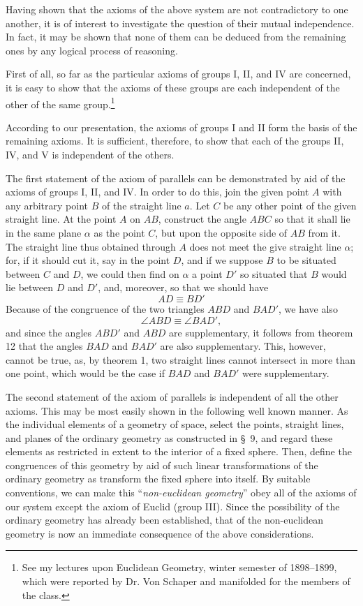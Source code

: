 \documentclass[11pt,oneside]{book}
\begin{document}
Having shown that the axioms of the above system are not
contradictory to one another, it is of interest to
investigate the question of their mutual independence.
In fact, it may be shown that none of them can be
deduced from the remaining ones by any logical process
of reasoning.

First of all, so far as the particular axioms of groups
I, II, and IV are concerned, it is easy to show that
the axioms of these groups are each independent of the
other of the same group.\footnote{See my lectures upon
Euclidean Geometry, winter semester of 1898--1899, which
were reported by Dr. Von Schaper and manifolded for the
members of the class.}

According to our presentation, the axioms of groups I and II form
the basis of the remaining axioms. It is sufficient, therefore, to
show that each of the groups II, IV, and V is independent of the
others.

The first statement of the axiom of parallels can be demonstrated
by aid of the axioms of groups I, II, and IV\@. In order to do this,
join the given point $A$ with any arbitrary point $B$ of the
straight line $a$. Let $C$ be any other point of the given straight
line. At
the point $A$ on $AB$, construct the angle $ABC$ so that it shall
lie in the same plane $\alpha$ as the point $C$, but upon the
opposite side of $AB$ from it. The straight line thus obtained
through $A$ does not meet the give straight line $\alpha$; for, if
it should cut it, say in the point $D$, and if we suppose $B$ to be
situated between $C$ and $D$, we could then find on $\alpha$ a
point $D'$ so situated that $B$ would lie between $D$ and $D'$,
and, moreover, so that we should have
\[
  AD \equiv BD'
\]
Because of the congruence of the two triangles $ABD$ and $BAD'$,
we have also
\[
  \angle ABD \equiv \angle BAD',
\]
and since the angles $ABD'$ and $ABD$ are supplementary,
it follows from theorem 12 that the angles $BAD$ and $BAD'$ are
also supplementary. This, however, cannot be true, as,
by theorem 1, two straight lines cannot intersect in more than one point,
which would be the case if $BAD$ and $BAD'$ were supplementary.

The second statement of the axiom of parallels is independent of
all the other axioms. This may be most easily shown in the
following well known manner. As the individual elements of a
geometry of space, select the points, straight lines, and planes of
the ordinary geometry as constructed in \S~9, and regard these
elements as restricted in extent to the interior of a fixed sphere.
Then, define the congruences of this geometry by aid of such linear
transformations of the ordinary geometry as transform the fixed
sphere into itself. By suitable conventions, we can make this
``\textit{non-euclidean geometry}'' obey all of the axioms of our
system except the axiom of Euclid (group III).
Since the possibility of the ordinary geometry has
already been established, that of the non-euclidean
geometry is now an immediate consequence of the
above considerations.
\end{document}
